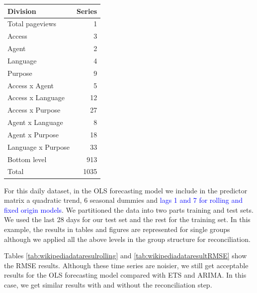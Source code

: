 \documentclass[11pt,a4paper,]{article}
\let\origtable\table
\let\endorigtable\endtable
\renewenvironment{table}[1][2] {
    \expandafter\origtable\expandafter[!htbp]
} {
    \endorigtable
}
\begin{document}
\begin{table}[!h]

\caption{\label{tab:wikidivision}Number of Wikipedia pageviews series at each aggregation level.}
\centering
\begin{tabular}[t]{lr}
\toprule
Division & Series\\
\midrule
Total pageviews & 1\\
Access & 3\\
Agent & 2\\
Language & 4\\
Purpose & 9\\
Access x Agent & 5\\
Access x Language & 12\\
Access x Purpose & 27\\
Agent x Language & 8\\
Agent x Purpose & 18\\
Language x Purpose & 33\\
Bottom level & 913\\
\hline
Total & 1035\\
\bottomrule
\end{tabular}
\end{table}

For this daily dataset, in the OLS forecasting model we include in the predictor matrix a quadratic trend, 6 seasonal dummies and \textcolor{blue} {lags 1 and 7 for rolling and fixed origin models}. We partitioned the data into two parts training and test sets. We used the last 28 days for our test set and the rest for the training set. In this example, the results in tables and figures are represented for single groups although we applied all the above levels in the group structure for reconciliation.

Tables \ref{tab:wikipediadataresulrolling} and \ref{tab:wikipediadataresultRMSE} show the RMSE results. Although these time series are noisier, we still get acceptable results for the OLS forecasting model compared with ETS and ARIMA. In this case, we get similar results with and without the reconciliation step.
\end{document}
